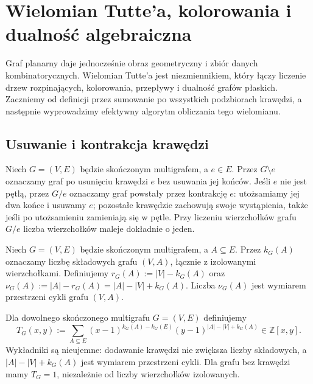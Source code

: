 \chapter{Wielomian Tutte'a, kolorowania i dualność algebraiczna}
\label{ch:tg-tutte}

Graf planarny daje jednocześnie obraz geometryczny i zbiór danych
kombinatorycznych. Wielomian Tutte'a jest niezmiennikiem, który
łączy liczenie drzew rozpinających, kolorowania, przepływy
i dualność grafów płaskich. Zaczniemy od definicji przez
sumowanie po wszystkich podzbiorach krawędzi, a następnie
wyprowadzimy efektywny algorytm obliczania tego wielomianu.

\section{Usuwanie i kontrakcja krawędzi}
\label{sec:tg-deletion-contraction}

\begin{definicja}
Niech $G=(V,E)$ będzie skończonym multigrafem, a $e\in E$.
Przez $G\setminus e$ oznaczamy graf po usunięciu krawędzi $e$
bez usuwania jej końców. Jeśli $e$ nie jest pętlą,
przez $G/e$ oznaczamy graf powstały przez kontrakcję $e$:
utożsamiamy jej dwa końce i usuwamy $e$; pozostałe krawędzie
zachowują swoje wystąpienia, także jeśli po utożsamieniu
zamieniają się w pętle. Przy liczeniu wierzchołków grafu $G/e$
liczba wierzchołków maleje dokładnie o jeden.
\end{definicja}

\begin{definicja}
Niech $G=(V,E)$ będzie skończonym multigrafem, a $A\subseteq E$.
Przez $k_G(A)$ oznaczamy liczbę składowych grafu $(V,A)$,
łącznie z izolowanymi wierzchołkami. Definiujemy
$r_G(A):=|V|-k_G(A)$ oraz
$\nu_G(A):=|A|-r_G(A)=|A|-|V|+k_G(A)$.
Liczba $\nu_G(A)$ jest wymiarem przestrzeni cykli grafu $(V,A)$.
\end{definicja}

\begin{definicja}
\label{def:tg-tutte}
Dla dowolnego skończonego multigrafu $G=(V,E)$ definiujemy
\[
T_G(x,y):=\sum_{A\subseteq E}
 (x-1)^{k_G(A)-k_G(E)}
 (y-1)^{|A|-|V|+k_G(A)}\in\mathbb Z[x,y].
\]
Wykładniki są nieujemne: dodawanie krawędzi nie zwiększa liczby
składowych, a $|A|-|V|+k_G(A)$ jest wymiarem przestrzeni cykli.
Dla grafu bez krawędzi mamy $T_G=1$, niezależnie od liczby
wierzchołków izolowanych.
\end{definicja}


